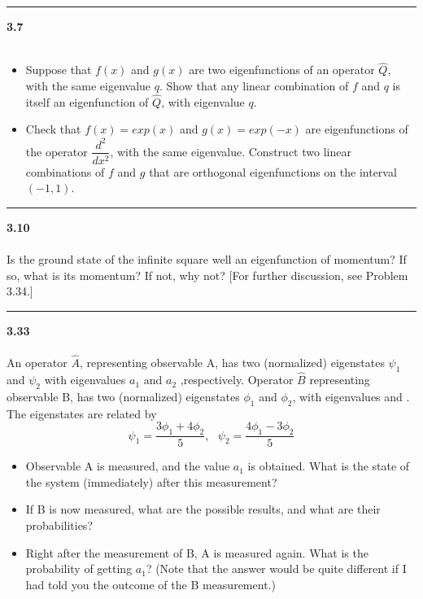 \documentclass[fleqn]{article}
\begin{document}
  \rule{15cm}{1pt}

  \textbf{3.7} \\ \\
  \begin{itemize}
    \item Suppose that $f(x)$ and $g(x)$ are two eigenfunctions of an operator $\hat{Q}$,
    with the same eigenvalue $q$. Show that any linear combination of $f$ and $q$ is
    itself an eigenfunction of $\hat{Q}$, with eigenvalue $q$.


    \item Check that $f(x)=exp(x)$ and $g(x)=exp(-x)$ are eigenfunctions of
    the operator $\dfrac{d^2}{dx^2}$, with the same eigenvalue. Construct two linear
    combinations of $f$ and $g$ that are orthogonal eigenfunctions on the interval $(-1,1)$.
    
  \end{itemize}


  \rule{15cm}{1pt}

  \textbf{3.10} \\ \\
  Is the ground state of the infinite square well an eigenfunction of
  momentum? If so, what is its momentum? If not, why not? [For further
  discussion, see Problem 3.34.]


  \rule{15cm}{1pt}

  \textbf{3.33} \\ \\
  An operator $\hat{A}$, representing observable
  A, has two (normalized) eigenstates $\psi_1$ and $\psi_2$ with eigenvalues $a_1$ and $a_2$
  ,respectively. Operator $\hat{B}$ representing observable B, has two (normalized)
  eigenstates $\phi_1$ and $\phi_2$, with eigenvalues and . The eigenstates are related
  by
  $$\psi_1=\dfrac{3\phi_1+4\phi_2}{5}, ~~~ \psi_2=\dfrac{4\phi_1-3\phi_2}{5}$$
  \begin{itemize}
    \item Observable A is measured, and the value $a_1$ is obtained. What is the state
    of the system (immediately) after this measurement?

    \item If B is now measured, what are the possible results, and what are their
    probabilities?
    
    \item Right after the measurement of B, A is measured again. What is the
    probability of getting $a_1$? (Note that the answer would be quite different if
    I had told you the outcome of the B measurement.)
    
  \end{itemize}
\end{document}
